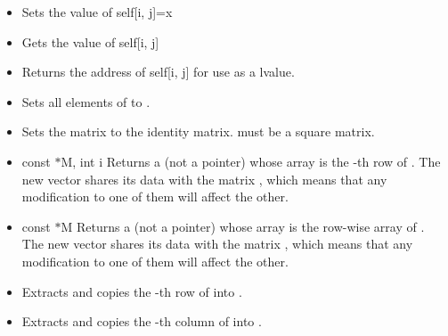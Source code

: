 \begin{itemize}
\item {}
  \sshortdescribe Sets the value of self[i, j]=x  

\item {}
  \sshortdescribe Gets the value of self[i, j]  

\item {}
  \sshortdescribe Returns the address of self[i, j] for use as a lvalue.

\item {}
  \sshortdescribe Sets all elements of  to .
  
\item {}
  \sshortdescribe Sets the matrix  to the identity
  matrix.  must be a square matrix.

\item {}
  {const  $\ast$M, int i}
  \sshortdescribe Returns a  (not a pointer) whose array is
  the -th row of . The new vector shares its data with the
  matrix , which means that any modification to one of them will affect
  the other.
  
\item {}
  {const  $\ast$M}
  \sshortdescribe Returns a  (not a pointer) whose array is
  the row-wise array of . The new vector shares its data with the
  matrix , which means that any modification to one of them will affect
  the other.

\item {}
  \sshortdescribe Extracts and copies the -th row of  into
  .

\item {}
  \sshortdescribe Extracts and copies the -th column of  into .
  

\end{itemize}
